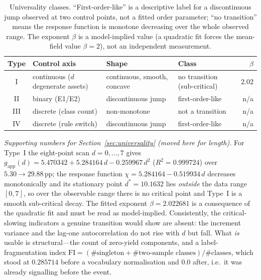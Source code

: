\documentclass{article}
\newcommand{\pp}{\,\mathrm{pp}}
\begin{document}
\begin{table}[h]
\centering
\small
\caption{Universality classes. ``First-order-like'' is a descriptive label for a discontinuous jump observed
at two control points, not a fitted order parameter; ``no transition'' means the response function is
monotone decreasing over the whole observed range. The exponent $\beta$ is a model-implied value (a
quadratic fit forces the mean-field value $\beta=2$), not an independent measurement.}
\label{tab:universality}
\begin{tabular}{@{}c p{2.8cm} p{4.0cm} p{2.6cm} r@{}}
\toprule
Type & Control axis & Shape & Class & $\beta$ \\
\midrule
I & continuous ($d$ degenerate assets) & continuous, smooth, concave & no transition (sub-critical) & $2.02$ \\
II & binary (E1/E2) & discontinuous jump & first-order-like & n/a \\
III & discrete (class count) & non-monotone & not a transition & n/a \\
IV & discrete (rule switch) & discontinuous jump & first-order-like & n/a \\
\bottomrule
\end{tabular}
\end{table}

\emph{Supporting numbers for Section~\ref{sec:universality} (moved here for length).} For Type~I the
eight-point scan $d=0,\dots,7$ gives $g_{\text{app}}(d)=5.470342+5.284164\,d-0.259967\,d^{2}$
($R^{2}=0.999724$) over $5.30\to29.88\pp$; the response function
$\chi=5.284164-0.519934\,d$ decreases monotonically and its stationary point $d^{*}=10.1632$ lies
\emph{outside} the data range $[0,7]$, so over the observable range there is no critical point and Type~I is
a smooth sub-critical decay. The fitted exponent $\beta=2.022681$ is a consequence of the quadratic fit and
must be read as model-implied. Consistently, the critical-slowing indicators a genuine transition would show
are absent: the increment variance and the lag-one autocorrelation do not rise with $d$ but fall. What
\emph{is} usable is structural---the count of zero-yield components, and a label-fragmentation index
$\mathrm{FI}=(\#\text{singleton}+\#\text{two-sample classes})/\#\text{classes}$, which stood at $0.285714$
before a vocabulary normalisation and $0.0$ after, i.e.\ it was already signalling before the event.
\end{document}
